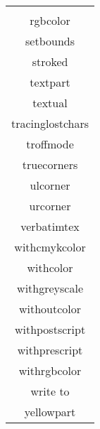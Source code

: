 \begin{table}
\begin{tabular}{|c|}
\begin{minipage}[b]{.75\linewidth}
\begin{multicols}{3}
restoreclipcolor\\
rgbcolor\\
setbounds\\
stroked\\
textpart\\
textual\\
tracinglostchars\\
troffmode\\
truecorners\\
ulcorner\\
urcorner\\
verbatimtex\\
withcmykcolor\\
withcolor\\
withgreyscale\\
withoutcolor\\
withpostscript\\
withprescript\\
withrgbcolor\\
write to\\
yellowpart
\end{multicols}
\end{minipage}\\\hline


\end{tabular}
\end{table}
